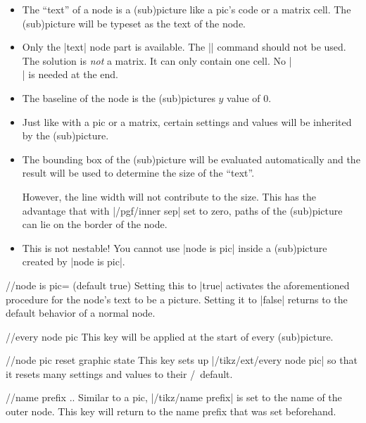 \begin{multicols}{2}
\begin{itemize}
\item The \enquote{text} of a node is a (sub)picture like a pic's code or a matrix cell.
      The (sub)picture will be typeset as the text of the node.
\item Only the |text| node part is available. The |\nodepart| command should not be used.
      The solution is \emph{not} a matrix. It can only contain one cell. No |\\| is needed at the end.
\item The baseline of the node is the (sub)pictures $y$ value of $0$.
\item Just like with a pic or a matrix, certain settings and values will be inherited by the (sub)picture.
\item The bounding box of the (sub)picture will be evaluated automatically and the result will be used to determine
      the size of the \enquote{text}.

      However, the line width will not contribute to the size.
      This has the advantage that with |/pgf/inner sep| set to zero, paths of the (sub)picture
      can lie on the border of the node.
\item This is not nestable!
      You cannot use |node is pic| inside a (sub)picture created by |node is pic|.
\end{itemize}

\newcolumn
\begin{key}{/\tikzext/node is pic= (default true)}
  Setting this to |true| activates the aforementioned procedure for the node's text to be a picture.
  Setting it to |false| returns to the default behavior of a normal node.
\end{key}
\begin{stylekey}{/\tikzext/every node pic}
This key will be applied at the start of every (sub)picture.
\end{stylekey}
\begin{key}{/\tikzext/node pic reset graphic state}
This key sets up |/tikz/ext/every node pic| so that it resets many settings and values
to their \pgfname/\tikzname\ default.
\end{key}

\begin{key}{/\tikzext/name prefix ..}
  Similar to a pic, |/tikz/name prefix| is set to the name of the outer node.
  This key will return to the name prefix that was set beforehand.
\end{key}
\begin{codeexample}[preamble=\usetikzlibrary{ext.nodes}]
\end{codeexample}
\newcolumn


\end{multicols}
